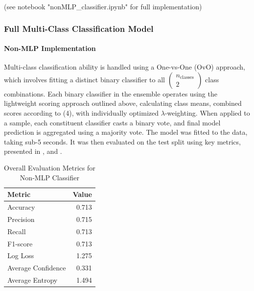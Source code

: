 (see notebook "nonMLP\_classifier.ipynb" for full implementation)
\subsubsection{Full Multi-Class Classification Model}

\paragraph{Non-MLP Implementation}

Multi-class classification ability is handled using a One-vs-One (OvO) approach, which involves fitting a distinct binary classifier to all $\begin{pmatrix}
    n_{\text{classes}}\\
    2
\end{pmatrix}$ class combinations. Each binary classifier in the ensemble operates using the lightweight scoring approach outlined above, calculating class means, combined scores according to (4), with individually optimized $\lambda$-weighting. When applied to a sample, each constituent classifier casts a binary vote, and final model prediction is aggregated using a majority vote. The model was fitted to the data, taking sub-5 seconds. It was then evaluated on the test split using key metrics, presented in ,  and .

\begin{table}%
\centering
\caption{Overall Evaluation Metrics for Non-MLP Classifier}
\begin{tabular}{lr}
\toprule
\textbf{Metric} & \textbf{Value} \\
\midrule
Accuracy            & 0.713 \\
Precision & 0.715 \\
Recall    & 0.713 \\
F1-score  & 0.713 \\
Log Loss             & 1.275 \\
Average Confidence   & 0.331 \\
Average Entropy      & 1.494 \\
\bottomrule
\end{tabular}
\label{tab:106}
\end{table}

